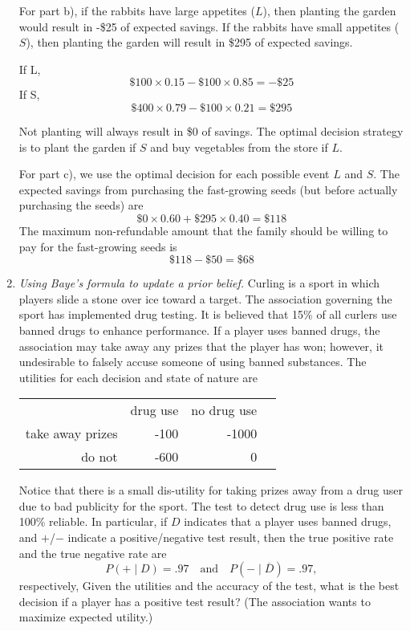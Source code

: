 \begin{enumerate}
\begin{solution}
For part b), if the rabbits have large appetites ($L$), then planting 
the garden would result in -\$25 of expected savings.
If the rabbits have small appetites ($S$), then planting the garden will result in \$295 
of expected savings. 

If L, \[ \$100 \times 0.15 - \$100 \times 0.85 = -\$25 \]
If S, \[ \$400 \times 0.79 - \$100 \times 0.21 = \$295 \]

Not planting will always result in \$0 of savings. 
The optimal decision strategy is to plant the garden if $S$ and buy vegetables 
from the store if $L$.

For part c), we use the optimal decision for each possible event $L$ and $S$. 
The expected savings from purchasing the fast-growing seeds
(but before actually purchasing the seeds) are
\[ \$0 \times 0.60 + \$295 \times 0.40 = \$118 \]
The maximum non-refundable amount that the family should be willing 
to pay for the fast-growing seeds is
\[ \$118 - \$50 = \$68 \]
\end{solution}

\item \emph{Using Baye's formula to update a prior belief.}
Curling is a sport in which players slide a stone over ice toward a
target. The association governing the sport has implemented drug
testing. It is believed that 15\% of all curlers use banned drugs to
enhance performance. If a player uses banned drugs, the association
may take away any prizes that the player has won; however, it
undesirable to falsely accuse someone of using banned substances.  The
utilities for each decision and state of nature are

\begin{center}
\begin{tabular}{rrrr}
& drug use & no drug use \\ \cline{2-3}
take away prizes & -100 & -1000 \\
do not & -600 & 0 
\end{tabular}
\end{center}

Notice that there is a small dis-utility for taking prizes away from a drug user
due to bad publicity for the sport. The test to detect drug use is
less than 100\% reliable. In particular, if $D$ indicates that a 
player uses banned drugs, and $+$/$-$ indicate a positive/negative
test result, then the true positive rate and the true negative rate
are
\[
P(+ \mid D) = .97 \quad \text{and} \quad P(- \mid \overline{D}) = .97,
\]
respectively, Given the utilities and the accuracy of the test, what is the best
decision if a player has a positive test result? (The association
wants to maximize expected utility.)


\end{enumerate}
